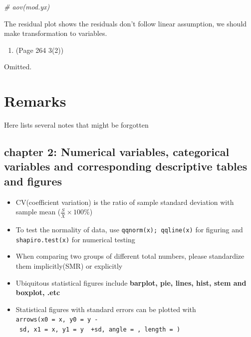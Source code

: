 \documentclass{article}
\newenvironment{Shaded}{\begin{snugshade}}{\end{snugshade}}
\newcommand{\CommentTok}[1]{\textcolor[rgb]{0.56,0.35,0.01}{\textit{#1}}}
\begin{document}
\begin{Shaded}
\begin{Highlighting}[]
\CommentTok{\# aov(mod.yx)}
\end{Highlighting}
\end{Shaded}

The residual plot shows the residuals don't follow linear assumption, we
should make transformation to variables.

\begin{enumerate}
\def\labelenumi{\arabic{enumi}.}
\setcounter{enumi}{1}
\tightlist
\item
  (Page 264 3(2))
\end{enumerate}

Omitted.

\newpage

\hypertarget{remarks}{%
\section{Remarks}\label{remarks}}

Here lists several notes that might be forgotten

\hypertarget{chapter-2-numerical-variables-categorical-variables-and-corresponding-descriptive-tables-and-figures}{%
\subsection{chapter 2: Numerical variables, categorical variables and
corresponding descriptive tables and
figures}\label{chapter-2-numerical-variables-categorical-variables-and-corresponding-descriptive-tables-and-figures}}

\begin{itemize}
\tightlist
\item
  CV(coefficient variation) is the ratio of sample standard deviation
  with sample mean (\(\frac{S}{\bar{X}}\times 100\%\))
\item
  To test the normality of data, use \texttt{qqnorm(x);\ qqline(x)} for
  figuring and \texttt{shapiro.test(x)} for numerical testing
\item
  When comparing two groups of different total numbers, please
  standardize them implicitly(SMR) or explicitly
\item
  Ubiquitous statistical figures include
  \textbf{barplot, pie, lines, hist, stem and boxplot, .etc}
\item
  Statistical figures with standard errors can be plotted with
  \texttt{arrows(x0\ =\ x,\ y0\ =\ y\ -\ sd,\ x1\ =\ x,\ y1\ =\ y\ \ +sd,\ angle\ =\ ,\ length\ =\ )}
\end{itemize}
\end{document}
